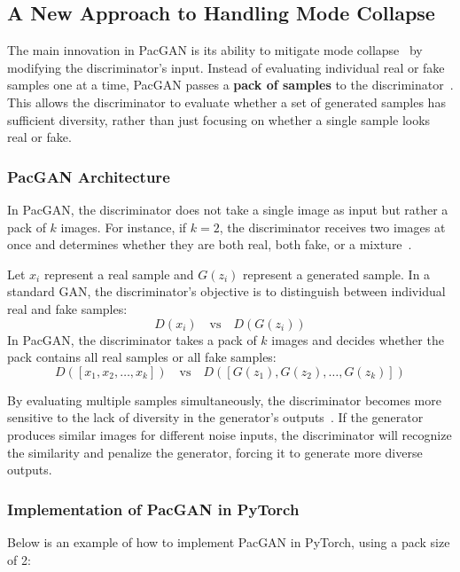 \subsection{A New Approach to Handling Mode Collapse}

The main innovation in PacGAN is its ability to mitigate mode collapse~\cite{zhang2018convergence} by modifying the discriminator's input. Instead of evaluating individual real or fake samples one at a time, PacGAN passes a \textbf{pack of samples} to the discriminator~\cite{lin2018pacgan}. This allows the discriminator to evaluate whether a set of generated samples has sufficient diversity, rather than just focusing on whether a single sample looks real or fake.

\subsubsection{PacGAN Architecture}
In PacGAN, the discriminator does not take a single image as input but rather a pack of \(k\) images. For instance, if \(k=2\), the discriminator receives two images at once and determines whether they are both real, both fake, or a mixture~\cite{lin2018pacgan}.

Let \(x_i\) represent a real sample and \(G(z_i)\) represent a generated sample. In a standard GAN, the discriminator's objective is to distinguish between individual real and fake samples:
\[
D(x_i) \quad \text{vs} \quad D(G(z_i))
\]
In PacGAN, the discriminator takes a pack of \(k\) images and decides whether the pack contains all real samples or all fake samples:
\[
D([x_1, x_2, \ldots, x_k]) \quad \text{vs} \quad D([G(z_1), G(z_2), \ldots, G(z_k)])
\]

By evaluating multiple samples simultaneously, the discriminator becomes more sensitive to the lack of diversity in the generator's outputs~\cite{lin2018pacgan}. If the generator produces similar images for different noise inputs, the discriminator will recognize the similarity and penalize the generator, forcing it to generate more diverse outputs.

\subsubsection{Implementation of PacGAN in PyTorch}
Below is an example of how to implement PacGAN in PyTorch, using a pack size of 2:

